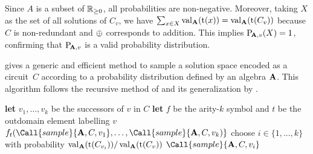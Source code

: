 Since \(A\) is a subset of \(\mathbb{R}_{\ge 0}\), all probabilities are non-negative.
Moreover, taking \(X\) as the set of all solutions of \(C_v\), we have \(\sum_{x \in X}\operatorname{val}_{\mathbf{A}}(\operatorname{t}(x)) = \operatorname{val}_{\mathbf{A}}(\operatorname{t}(C_v))\)
because \(C\) is non-redundant and \(\mathbin{\oplus}\) corresponds to addition.
This implies \(\mathrm{P}\!_{\mathbf{A},v}(X) = 1\), confirming that \(\mathrm{P}\!_{\mathbf{A},v}\) is a valid probability distribution.

 gives a generic and efficient method to sample a solution space encoded as a circuit~\(C\) according to a probability distribution defined by an algebra \(\mathbf{A}\).
This algorithm follows the recursive method of \textcite{Wilf1977UnifiedSettingSequencing} and its generalization by \textcite{Ponty2011CombinatorialFrameworkDesigning}.

\begin{algorithm}
    \capstart
    \begin{algorithmic}[1]
            \State \textbf{let} \(v_1, \ldots, v_k\) be the successors of \(v\) in \(C\)
                \State \textbf{let} \(f\) be the arity-\(k\) symbol and \(t\) be the outdomain element labelling \(v\)
                \State \Return \(f_t(\Call{sample}{\alg, C, v_1}, \ldots, \Call{sample}{\alg, C, v_k)}\)
            \Else
                \State choose \(i \in \{1, ..., k\}\) with probability \(\operatorname{val}_{\mathbf{A}}(\operatorname{t}(C_{v_i}))/\operatorname{val}_{\mathbf{A}}(\operatorname{t}(C_v))\)
                \State \Return \(\Call{sample}{\alg, C, v_i}\)
            \EndIf
        \EndFunction
    \end{algorithmic}
    \caption[Generic sampling algorithm for algebraic circuits]{
        Generic sampling algorithm for algebraic circuits.
        \label{alg:adp:circ-sample}
    }
\end{algorithm}

